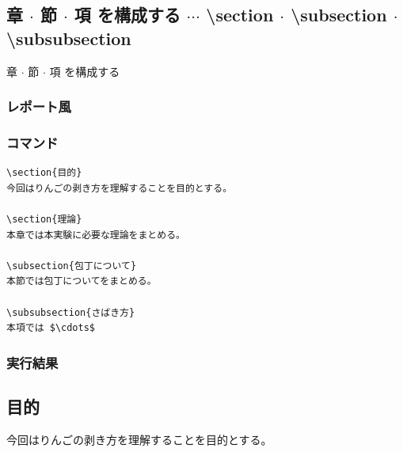 \documentclass[a4j, titlepage]{jarticle}
\begin{document}
\subsection{章 $\cdot$ 節 $\cdot$ 項 を構成する $\cdots$ \textbackslash section $\cdot$ \textbackslash subsection $\cdot$ \textbackslash subsubsection}

章 $\cdot$ 節 $\cdot$ 項 を構成する

\subsubsection{レポート風}
\begin{multicols}{2}

\subsubsection*{コマンド}

\begin{lstlisting}
\section{目的}
今回はりんごの剥き方を理解することを目的とする。

\section{理論}
本章では本実験に必要な理論をまとめる。

\subsection{包丁について}
本節では包丁についてをまとめる。

\subsubsection{さばき方}
本項では $\cdots$
\end{lstlisting}

\vfill\null
\columnbreak

\subsubsection*{実行結果}
\setcounter{section}{0}
\begin{screen}

    \section{目的}
    今回はりんごの剥き方を理解することを目的とする。


\end{screen}
\end{multicols}
\end{document}
